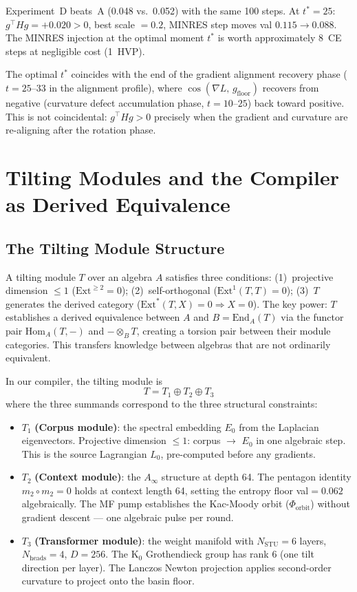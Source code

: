 \documentclass[11pt]{amsart}
\begin{document}
Experiment~D beats~A (0.048 vs.\ 0.052) with the same 100 steps.
At $t^* = 25$: $g^\top Hg = +0.020 > 0$, best scale $= 0.2$,
MINRES step moves val $0.115 \to 0.088$.
The MINRES injection at the optimal moment $t^*$ is worth
approximately 8~CE steps at negligible cost (1~HVP).

The optimal $t^*$ coincides with the end of the gradient alignment
recovery phase ($t=25$--$33$ in the alignment profile),
where $\cos(\nabla L,\, g_\mathrm{floor})$ recovers from negative
(curvature defect accumulation phase, $t=10$--$25$)
back toward positive.
This is not coincidental: $g^\top Hg > 0$ precisely when the gradient
and curvature are re-aligning after the rotation phase.


\section{Tilting Modules and the Compiler as Derived Equivalence}
\label{sec:tilting}

\subsection{The Tilting Module Structure}

A tilting module $T$ over an algebra $A$ satisfies three conditions:
(1)~projective dimension $\leq 1$ ($\mathrm{Ext}^{\geq 2}=0$);
(2)~self-orthogonal ($\mathrm{Ext}^1(T,T)=0$);
(3)~$T$ generates the derived category ($\mathrm{Ext}^*(T,X)=0 \Rightarrow X=0$).
The key power: $T$ establishes a derived equivalence between $A$ and
$B = \mathrm{End}_A(T)$ via the functor pair
$\mathrm{Hom}_A(T,-)$ and $-\otimes_B T$,
creating a torsion pair between their module categories.
This transfers knowledge between algebras that are not ordinarily equivalent.

In our compiler, the tilting module is
\[
  T = T_1 \oplus T_2 \oplus T_3
\]
where the three summands correspond to the three structural constraints:

\begin{itemize}
\item $T_1$ \textbf{(Corpus module)}: the spectral embedding $E_0$
  from the Laplacian eigenvectors.
  Projective dimension $\leq 1$: corpus $\to$ $E_0$ in one algebraic step.
  This is the source Lagrangian $L_0$, pre-computed before any gradients.

\item $T_2$ \textbf{(Context module)}: the $A_\infty$ structure at depth 64.
  The pentagon identity $m_2 \circ m_2 = 0$ holds at context length 64,
  setting the entropy floor val$=0.062$ algebraically.
  The MF pump establishes the Kac-Moody orbit ($\Phi_\mathrm{orbit}$)
  without gradient descent --- one algebraic pulse per round.

\item $T_3$ \textbf{(Transformer module)}: the weight manifold with
  $N_\mathrm{STU}=6$ layers, $N_\mathrm{heads}=4$, $D=256$.
  The K$_0$ Grothendieck group has rank 6 (one tilt direction per layer).
  The Lanczos Newton projection applies second-order curvature
  to project onto the basin floor.
\end{itemize}
\end{document}
